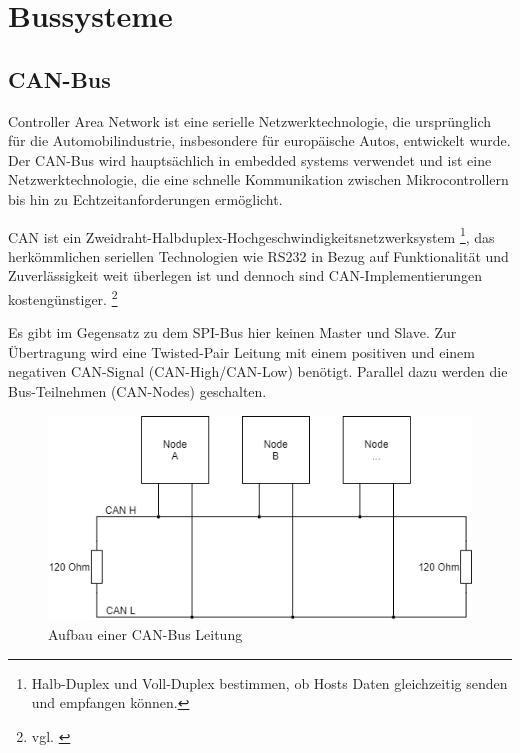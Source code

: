 

\section{Bussysteme}

\subsection{CAN-Bus}

Controller Area Network ist eine serielle Netzwerktechnologie, die ursprünglich für die Automobilindustrie, insbesondere für europäische Autos, entwickelt wurde. Der CAN-Bus wird hauptsächlich in embedded systems verwendet und ist eine Netzwerktechnologie, die eine schnelle Kommunikation zwischen Mikrocontrollern bis hin zu Echtzeitanforderungen ermöglicht. \\ \medskip

CAN ist ein Zweidraht-Halbduplex-Hochgeschwindigkeitsnetzwerksystem \footnote{Halb-Duplex und Voll-Duplex bestimmen, ob Hosts Daten gleichzeitig senden und empfangen können.}, das herkömmlichen seriellen Technologien wie RS232 in Bezug auf Funktionalität und Zuverlässigkeit weit überlegen ist und dennoch sind CAN-Implementierungen kostengünstiger. \footnote{vgl. \cite{can}}

Es gibt im Gegensatz zu dem SPI-Bus hier keinen Master und Slave. Zur Übertragung wird eine Twisted-Pair Leitung mit einem positiven und einem negativen CAN-Signal (CAN-High/CAN-Low) benötigt. Parallel dazu werden die Bus-Teilnehmen (CAN-Nodes) geschalten.

\begin{figure}[H]
	\begin{center}
		\includegraphics[scale=0.5]{figures/hcis/can_nodes.png}
		\caption{Aufbau einer CAN-Bus Leitung}
	\end{center}
\end{figure}

